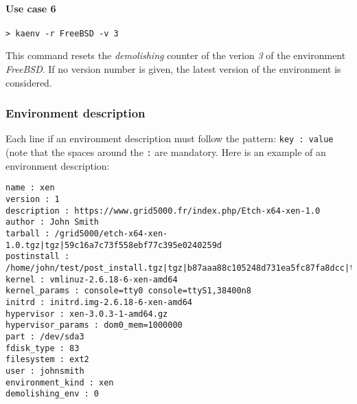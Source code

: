 \documentclass[a4wide,10pt,oneside]{book}
\begin{document}
\paragraph{Use case 6}
\begin{verbatim}
> kaenv -r FreeBSD -v 3
\end{verbatim}
This command resets the \textit{demolishing} counter of the verion \textit{3} of the environment \textit{FreeBSD}. If no version number is given, the latest version of the environment is considered.

\subsubsection{Environment description}\label{sec:env_desc}
Each line if an environment description must follow the pattern: \texttt{key : value} (note that the spaces around the \texttt{:} are mandatory.
Here is an example of an environment description:
\begin{small}
\begin{verbatim}
name : xen
version : 1
description : https://www.grid5000.fr/index.php/Etch-x64-xen-1.0
author : John Smith
tarball : /grid5000/etch-x64-xen-1.0.tgz|tgz|59c16a7c73f558ebf77c395e0240259d
postinstall : /home/john/test/post_install.tgz|tgz|b87aaa88c105248d731ea5fc87fa8dcc|traitement.sh
kernel : vmlinuz-2.6.18-6-xen-amd64
kernel_params : console=tty0 console=ttyS1,38400n8
initrd : initrd.img-2.6.18-6-xen-amd64
hypervisor : xen-3.0.3-1-amd64.gz
hypervisor_params : dom0_mem=1000000
part : /dev/sda3
fdisk_type : 83
filesystem : ext2
user : johnsmith
environment_kind : xen
demolishing_env : 0
\end{verbatim}
\end{small}
\end{document}
